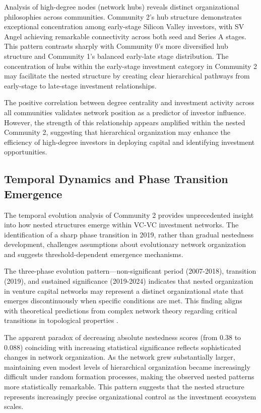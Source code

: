Analysis of high-degree nodes (network hubs) reveals distinct organizational philosophies across communities. Community 2's hub structure demonstrates exceptional concentration among early-stage Silicon Valley investors, with SV Angel achieving remarkable connectivity across both seed and Series A stages. This pattern contrasts sharply with Community 0's more diversified hub structure and Community 1's balanced early-late stage distribution. The concentration of hubs within the early-stage investment category in Community 2 may facilitate the nested structure by creating clear hierarchical pathways from early-stage to late-stage investment relationships.

The positive correlation between degree centrality and investment activity across all communities validates network position as a predictor of investor influence. However, the strength of this relationship appears amplified within the nested Community 2, suggesting that hierarchical organization may enhance the efficiency of high-degree investors in deploying capital and identifying investment opportunities.

\subsection{Temporal Dynamics and Phase Transition Emergence}


The temporal evolution analysis of Community 2 provides unprecedented insight into how nested structures emerge within VC-VC investment networks. The identification of a sharp phase transition in 2019, rather than gradual nestedness development, challenges assumptions about evolutionary network organization and suggests threshold-dependent emergence mechanisms.

The three-phase evolution pattern—non-significant period (2007-2018), transition (2019), and sustained significance (2019-2024) indicates that nested organization in venture capital networks may represent a distinct organizational state that emerges discontinuously when specific conditions are met. This finding aligns with theoretical predictions from complex network theory regarding critical transitions in topological properties \cite{Mariani2019}.

The apparent paradox of decreasing absolute nestedness scores (from 0.38 to 0.088) coinciding with increasing statistical significance reflects sophisticated changes in network organization. As the network grew substantially larger, maintaining even modest levels of hierarchical organization became increasingly difficult under random formation processes, making the observed nested patterns more statistically remarkable. This pattern suggests that the nested structure represents increasingly precise organizational control as the investment ecosystem scales.

